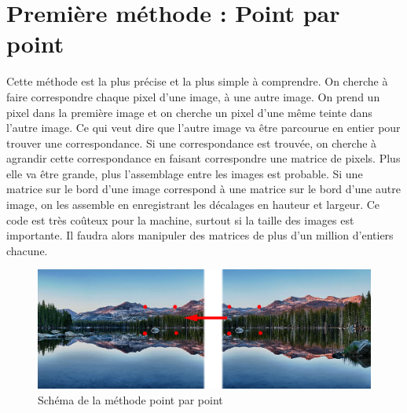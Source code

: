 \documentclass[a4paper,french,12pt]{report}
\begin{document}
		\section{Première méthode : Point par point}
		    Cette méthode est la plus précise et la plus simple à comprendre. On cherche à faire correspondre chaque pixel d'une image, à une autre image.
		    On prend un pixel dans la première image et on cherche un pixel d'une même teinte dans l'autre image. Ce qui veut dire que l'autre image va être parcourue en entier pour trouver une correspondance. Si une correspondance est trouvée, on cherche à agrandir cette correspondance en faisant correspondre une matrice de pixels. Plus elle va être grande, plus l'assemblage entre les images est probable. Si une matrice sur le bord d'une image correspond à une matrice sur le bord d'une autre image, on les assemble en enregistrant les décalages en hauteur et largeur. Ce code est très coûteux pour la machine, surtout si la taille des images est importante. Il faudra alors manipuler des matrices de plus d'un million d'entiers chacune.
		    
		    \begin{figure}[h]
		     \begin{center}
		      \includegraphics[scale=.23]{images/panorama3.png}
		      \caption{Schéma de la méthode point par point}
		     \end{center}
  
		    \end{figure}
\end{document}
